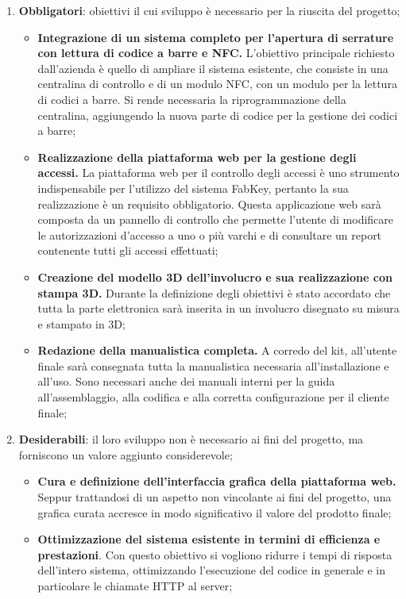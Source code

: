 \begin{enumerate}
\item \textbf{Obbligatori}: obiettivi il cui sviluppo è necessario per la riuscita del progetto;
\begin{itemize}
\item \textbf{Integrazione di un sistema completo per l'apertura di serrature con lettura di codice a barre e NFC.} L'obiettivo principale richiesto dall'azienda è quello di ampliare il sistema esistente, che consiste in una centralina di controllo e di un modulo NFC, con un modulo per la lettura di codici a barre. Si rende necessaria la riprogrammazione della centralina, aggiungendo la nuova parte di codice per la gestione dei codici a barre; 
\item \textbf{Realizzazione della piattaforma web per la gestione degli accessi.} La piattaforma web per il controllo degli accessi è uno strumento indispensabile per l'utilizzo del sistema FabKey, pertanto la sua realizzazione è un requisito obbligatorio. Questa applicazione web sarà composta da un pannello di controllo che permette l'utente di modificare le autorizzazioni d'accesso a uno o più varchi e di consultare un report contenente tutti gli accessi effettuati; 
\item \textbf{Creazione del modello 3D dell'involucro e sua realizzazione con stampa 3D.} Durante la definizione degli obiettivi è stato accordato che tutta la parte elettronica sarà inserita in un involucro disegnato su misura e stampato in 3D; 
\item \textbf{Redazione della manualistica completa.} A corredo del kit, all'utente finale sarà consegnata tutta la manualistica necessaria all'installazione e all'uso. Sono necessari anche dei manuali interni per la guida all'assemblaggio, alla codifica e alla corretta configurazione per il cliente finale;
\end{itemize}

\medskip

\item \textbf{Desiderabili}: il loro sviluppo non è necessario ai fini del progetto, ma forniscono un valore aggiunto considerevole;
\begin{itemize}
\item \textbf{Cura e definizione dell'interfaccia grafica della piattaforma web.} Seppur trattandosi di un aspetto non vincolante ai fini del progetto, una grafica curata accresce in modo significativo il valore del prodotto finale;
\item \textbf{Ottimizzazione del sistema esistente in termini di efficienza e prestazioni}. Con questo obiettivo si vogliono ridurre i tempi di risposta dell'intero sistema, ottimizzando l'esecuzione del codice in generale e in particolare le chiamate HTTP al server; 
\end{itemize}


\end{enumerate}
